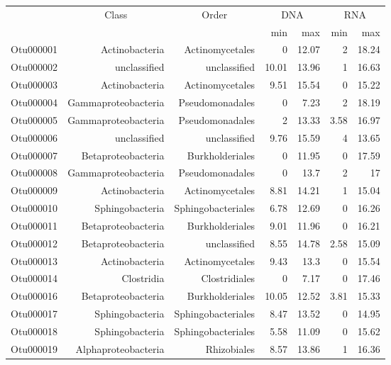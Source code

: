 \begin{table}[ht]
\centering
\begin{tabular}{crrrrrr}
  \hline
  & \multicolumn{1}{c}{Class} & \multicolumn{1}{c}{Order} & 
                      \multicolumn{2}{c}{DNA} & \multicolumn{2}{c}{RNA} \\
 & &  & min & max & min & max \\
 \hline
Otu000001 & Actinobacteria & Actinomycetales & 0 & 12.07 & 2 & 18.24 \\ 
  Otu000002 & unclassified & unclassified & 10.01 & 13.96 & 1 & 16.63 \\ 
  Otu000003 & Actinobacteria & Actinomycetales & 9.51 & 15.54 & 0 & 15.22 \\ 
  Otu000004 & Gammaproteobacteria & Pseudomonadales & 0 & 7.23 & 2 & 18.19 \\ 
  Otu000005 & Gammaproteobacteria & Pseudomonadales & 2 & 13.33 & 3.58 & 16.97 \\ 
  Otu000006 & unclassified & unclassified & 9.76 & 15.59 & 4 & 13.65 \\ 
  Otu000007 & Betaproteobacteria & Burkholderiales & 0 & 11.95 & 0 & 17.59 \\ 
  Otu000008 & Gammaproteobacteria & Pseudomonadales & 0 & 13.7 & 2 & 17 \\ 
  Otu000009 & Actinobacteria & Actinomycetales & 8.81 & 14.21 & 1 & 15.04 \\ 
  Otu000010 & Sphingobacteria & Sphingobacteriales & 6.78 & 12.69 & 0 & 16.26 \\ 
  Otu000011 & Betaproteobacteria & Burkholderiales & 9.01 & 11.96 & 0 & 16.21 \\ 
  Otu000012 & Betaproteobacteria & unclassified & 8.55 & 14.78 & 2.58 & 15.09 \\ 
  Otu000013 & Actinobacteria & Actinomycetales & 9.43 & 13.3 & 0 & 15.54 \\ 
  Otu000014 & Clostridia & Clostridiales & 0 & 7.17 & 0 & 17.46 \\ 
  Otu000016 & Betaproteobacteria & Burkholderiales & 10.05 & 12.52 & 3.81 & 15.33 \\ 
  Otu000017 & Sphingobacteria & Sphingobacteriales & 8.47 & 13.52 & 0 & 14.95 \\ 
  Otu000018 & Sphingobacteria & Sphingobacteriales & 5.58 & 11.09 & 0 & 15.62 \\ 
  Otu000019 & Alphaproteobacteria & Rhizobiales & 8.57 & 13.86 & 1 & 16.36 \\ 

\end{tabular}
\end{table}
